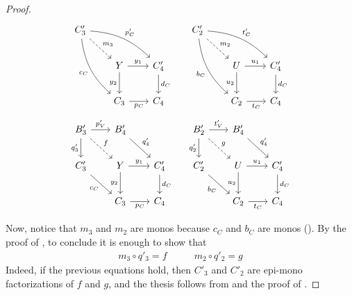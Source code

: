 \begin{proof}
	\[\begin{tikzcd}[row sep = 20, column sep = 20]
	{C'_3} &&& {C_2'} \\
	& Y & {C'_4} & {} & U & {C_4'} \\
	& {C_3} & {C_4} && {C_2} & {C_4}
	\arrow["{m_3}", dashed, from=1-1, to=2-2]
	\arrow["{p'_C}", from=1-1, to=2-3, bend left = 20]
	\arrow["{c_C}"', from=1-1, to=3-2, bend right = 20]
	\arrow["{m_2}", dashed, from=1-4, to=2-5]
	\arrow["{t'_C}", from=1-4, to=2-6, bend left = 20]
	\arrow["{b_C}"', from=1-4, to=3-5, bend right = 20]
	\arrow["{y_1}", from=2-2, to=2-3]
	\arrow["{y_2}"', from=2-2, to=3-2]
	\arrow["{d_C}", from=2-3, to=3-3]
	\arrow["{u_1}", from=2-5, to=2-6]
	\arrow["{u_2}"', from=2-5, to=3-5]
	\arrow["{d_C}", from=2-6, to=3-6]
	\arrow["{p_C}"', from=3-2, to=3-3]
	\arrow["{t_C}"', from=3-5, to=3-6]
	\end{tikzcd}\]
	\[\begin{tikzcd}[row sep = 20, column sep = 20]
	{B_3'} & {B'_4} && {B'_2} & {B'_4} \\
	{C'_3} & Y & {C'_4} & {C_2'} & U & {C_4'} \\
	& {C_3} & {C_4} && {C_2} & {C_4}
	\arrow["{p'_V}", from=1-1, to=1-2]
	\arrow["{q'_3}"', from=1-1, to=2-1]
	\arrow["f", dashed, from=1-1, to=2-2]
	\arrow["{q'_4}", from=1-2, to=2-3]
	\arrow["{t'_V}", from=1-4, to=1-5]
	\arrow["{q'_2}"', from=1-4, to=2-4]
	\arrow["g", dashed, from=1-4, to=2-5]
	\arrow["{q'_4}", from=1-5, to=2-6]
	\arrow["{c_C}"', from=2-1, to=3-2]
	\arrow["{y_1}", from=2-2, to=2-3]
	\arrow["{y_2}"', from=2-2, to=3-2]
	\arrow["{d_C}", from=2-3, to=3-3]
	\arrow["{b_C}"', from=2-4, to=3-5]
	\arrow["{u_1}", from=2-5, to=2-6]
	\arrow["{u_2}"', from=2-5, to=3-5]
	\arrow["{d_C}", from=2-6, to=3-6]
	\arrow["{p_C}"', from=3-2, to=3-3]
	\arrow["{t_C}"', from=3-5, to=3-6]
\end{tikzcd}\]

	Now, notice that $m_3$ and $m_2$ are monos because $c_C$ and $b_C$ are monos (). By the proof of , to conclude it is enough to show that
	\[\begin{split}
		m_3 \circ q'_3 = f
	\end{split}
	\qquad
	\begin{split}
		m_2\circ q'_2 = g
	\end{split}\]
	Indeed, if the previous equations hold, then $C'_3$ and $C'_2$ are epi-mono factorizations of $f$ and $g$, and the thesis follows from  and the proof of .
	

\end{proof}
